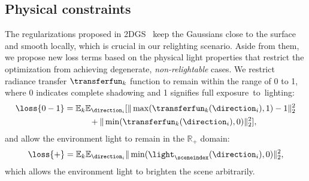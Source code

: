   \subsection{Physical constraints}
    \label{subsec:lumigauss-constraints}
    The regularizations proposed in 2DGS~\cite{huang20242d} keep the Gaussians
    close to the surface and smooth locally, which is crucial in our
    relighting scenario.
    Aside from them, we propose new loss terms based on the physical light
    properties that restrict the optimization from achieving degenerate,
    \textit{non-relightable} cases.
    We restrict radiance transfer $\transferfun_k$ function to remain within the range of 0 to 1, where 0 indicates complete shadowing and 1 signifies full exposure~to~lighting:
    \begin{equation}
      \begin{split}
        \loss{0-1} & =\mathbb{E}_k\mathbb{E}_{\direction_i} [\|\max(\transferfun_k(\direction_i), 1)-1\|^2_2 \\
                   & \qquad\quad+ \|\min(\transferfun_k(\direction_i), 0)\|^2_2],
      \end{split}
    \end{equation}
    and allow the environment light to remain in the $\mathbb{R}_{+}$ domain:
    \begin{equation}
      \loss{+} = \mathbb{E}_k\mathbb{E}_{\direction_i}\|\min(\light_\sceneindex(\direction_i), 0)\|^2_2,
    \end{equation}
    which allows the environment light to brighten the scene arbitrarily.

